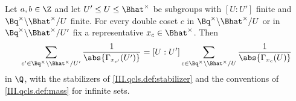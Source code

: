 Let $a,b\in\Z$ and let $U'\le U\le\Bhat^\times$ be subgroups with $[U:U']$ finite and $\Bq^\times\backslash\Bhat^\times/U$ finite. For every
double coset $c$ in $\Bq^\times\backslash\Bhat^\times/U$ or in $\Bq^\times\backslash\Bhat^\times/U'$ fix a representative $x_c\in\Bhat^\times$. Then
\[
  \sum_{c'\in\Bq^\times\backslash\Bhat^\times/U'}\frac1{\abs{\Gamma_{x_{c'}}(U')}}=[U:U']\sum_{c\in\Bq^\times\backslash\Bhat^\times/U}\frac1{\abs{\Gamma_{x_c}(U)}}
\]
in $\Q$, with the stabilizers of \cref{III.qcls.def:stabilizer} and the conventions of \cref{III.qcls.def:mass} for infinite sets.
